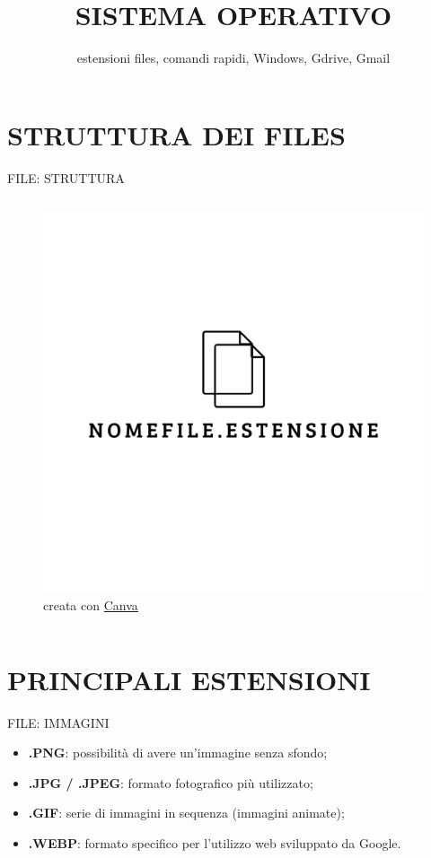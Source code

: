 \documentclass[aspectratio=1610]{beamer}
\title{SISTEMA OPERATIVO}
\subtitle{estensioni files, comandi rapidi, Windows, Gdrive, Gmail}
\date{}
\institute{\textit{
        Fonti:
        \begin{itemize}
            \item[-] \href{https://it.wikipedia.org/wiki/Lista_di_formati_di_file}{Wikipedia}
            \item[-] \href{https://support.microsoft.com/it-it/windows/scelte-rapide-da-tastiera-in-windows-dcc61a57-8ff0-cffe-9796-cb9706c75eec}{Documentazione Microsoft}
        \end{itemize}
    }
}
\begin{document}
\begin{frame}
    \titlepage
\end{frame}

\section{STRUTTURA DEI FILES}

\begin{frame}{FILE: STRUTTURA}
    \begin{columns}
        \begin{figure}
            \includegraphics[width=\linewidth]{img/file.png}
            \caption{{creata con \href{https://www.canva.com}{Canva}}}
        \end{figure}
    \end{columns}
\end{frame}

\section{PRINCIPALI ESTENSIONI}

\begin{frame}{FILE: IMMAGINI}
    \begin{itemize}
        \item \textbf{.PNG}: possibilità di avere un'immagine senza sfondo;
        \pause
        \item \textbf{.JPG / .JPEG}: formato fotografico più utilizzato;
        \pause
        \item \textbf{.GIF}: serie di immagini in sequenza (immagini animate);
        \pause
        \item \textbf{.WEBP}: formato specifico per l'utilizzo web sviluppato da Google.
    \end{itemize}
\end{frame}
\end{document}
